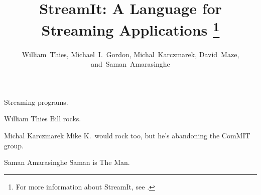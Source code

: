 \documentclass[10pt,twocolumn,twoside]{IEEEtran}
\begin{document}
\pagestyle{headings}

\title{StreamIt: A Language for Streaming Applications%
\thanks{For more information about StreamIt, see \streamiturl.}}

\author{William~Thies, Michael~I.~Gordon, Michal~Karczmarek, David~Maze, and~Saman~Amarasinghe}


\maketitle

\begin{abstract}

\end{abstract}

\begin{keywords}
Streaming programs.
\end{keywords}




%







%

\begin{biography}{William Thies}
Bill rocks.
\end{biography}

\begin{biography}{Michal Karczmarek}
Mike K.~would rock too, but he's abandoning the ComMIT group.
\end{biography}

\begin{biography}%
{Saman Amarasinghe}
Saman is The Man.
\end{biography}
\end{document}
